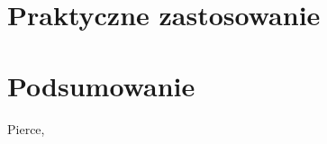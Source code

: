 \documentclass[11pt,leqno]{article}
\begin{document}
\section{Praktyczne zastosowanie}                       
\setcounter{equation}{0}


\section{Podsumowanie}                       
\setcounter{equation}{0}




\thispagestyle{empty}
\begin{thebibliography}{99}

 Pierce, \textit{} 


	  
\end{thebibliography}
\end{document}
